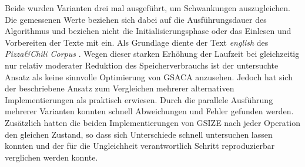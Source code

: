Beide wurden Varianten drei mal ausgeführt, um Schwankungen auszugleichen.
Die gemessenen Werte beziehen sich dabei auf die Ausführungsdauer des Algorithmus und beziehen nicht die Initialisierungsphase oder das Einlesen und Vorbereiten der Texte mit ein.
Als Grundlage diente der Text \textit{english} des \textit{Pizza\&Chili Corpus} \cite{testdaten:pizzachilli2007}.
Wegen dieser starken Erhöhung der Laufzeit bei gleich\-zeitig nur relativ moderater Reduktion des Speicherverbrauchs ist der untersuchte Ansatz als keine sinnvolle Optimierung von GSACA anzusehen.
Jedoch hat sich der beschriebene Ansatz zum Vergleichen mehrerer alternativen Implementierungen als praktisch erwiesen.
Durch die parallele Ausführung mehrerer Varianten konnten schnell Abweichungen und Fehler gefunden werden.
Zusätz\-lich hatten die beiden Implementierungen von GSIZE nach jeder Operation den gleichen Zustand, so dass sich Unterschiede schnell untersuchen lassen konnten und der für die Ungleichheit verantwortlich Schritt reproduzierbar verglichen werden konnte. \par


